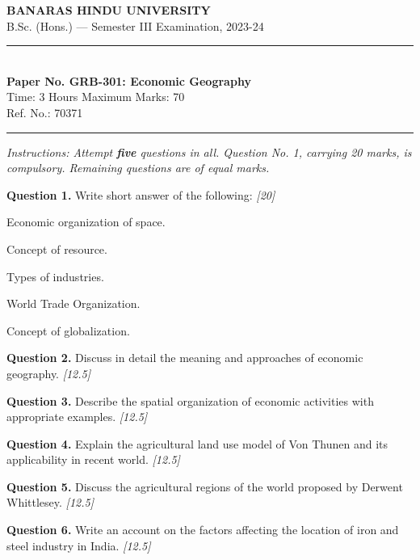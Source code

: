 \documentclass[11pt,a4paper]{article}
\newcommand{\pts}[1]{\hfill   \textit{[#1]}}
\begin{document}
\begin{center}
  {\large\bfseries BANARAS HINDU UNIVERSITY}\\[2pt]
  {\normalsize B.Sc. (Hons.) --- Semester III Examination, 2023-24}\\[6pt]
  \rule{0.8\linewidth}{0.5pt}\\[6pt]
  {\large\bfseries Paper No. GRB-301: Economic Geography}\\[4pt]
  {\normalsize Time: 3 Hours \hfill Maximum Marks: 70}\\[2pt]
  {\small Ref. No.: 70371}
\end{center}
\rule{\linewidth}{0.4pt}
\smallskip



\noindent   \textit{Instructions: Attempt   \textbf{five} questions in all. Question No. 1, carrying 20 marks, is compulsory. Remaining questions are of equal marks.}
\bigskip




\noindent   \textbf{Question 1.} Write short answer of the following: \pts{20}

\begin{parts}
  \item Economic organization of space.
  \item Concept of resource.
  \item Types of industries.
  \item World Trade Organization.
  \item Concept of globalization.
\end{parts}

\medskip


\noindent   \textbf{Question 2.} Discuss in detail the meaning and approaches of economic geography. \pts{12.5}

\medskip


\noindent   \textbf{Question 3.} Describe the spatial organization of economic activities with appropriate examples. \pts{12.5}

\medskip


\noindent   \textbf{Question 4.} Explain the agricultural land use model of Von Thunen and its applicability in recent world. \pts{12.5}

\medskip


\noindent   \textbf{Question 5.} Discuss the agricultural regions of the world proposed by Derwent Whittlesey. \pts{12.5}

\medskip


\noindent   \textbf{Question 6.} Write an account on the factors affecting the location of iron and steel industry in India. \pts{12.5}
\end{document}
